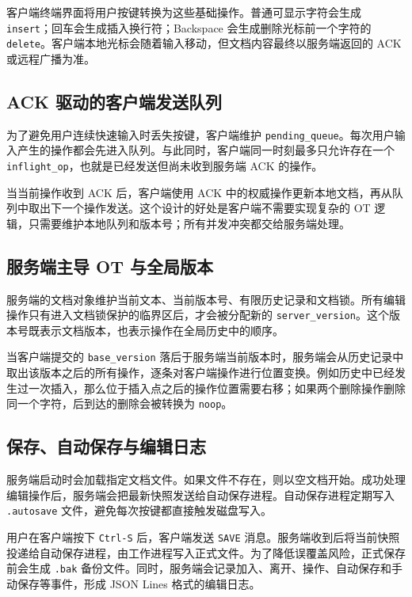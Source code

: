 客户端终端界面将用户按键转换为这些基础操作。普通可显示字符会生成 \verb|insert|；回车会生成插入换行符；Backspace 会生成删除光标前一个字符的 \verb|delete|。客户端本地光标会随着输入移动，但文档内容最终以服务端返回的 ACK 或远程广播为准。

\subsection{ACK 驱动的客户端发送队列}

为了避免用户连续快速输入时丢失按键，客户端维护 \verb|pending_queue|。每次用户输入产生的操作都会先进入队列。与此同时，客户端同一时刻最多只允许存在一个 \verb|inflight_op|，也就是已经发送但尚未收到服务端 ACK 的操作。

当当前操作收到 ACK 后，客户端使用 ACK 中的权威操作更新本地文档，再从队列中取出下一个操作发送。这个设计的好处是客户端不需要实现复杂的 OT 逻辑，只需要维护本地队列和版本号；所有并发冲突都交给服务端处理。

\subsection{服务端主导 OT 与全局版本}

服务端的文档对象维护当前文本、当前版本号、有限历史记录和文档锁。所有编辑操作只有进入文档锁保护的临界区后，才会被分配新的 \verb|server_version|。这个版本号既表示文档版本，也表示操作在全局历史中的顺序。

当客户端提交的 \verb|base_version| 落后于服务端当前版本时，服务端会从历史记录中取出该版本之后的所有操作，逐条对客户端操作进行位置变换。例如历史中已经发生过一次插入，那么位于插入点之后的操作位置需要右移；如果两个删除操作删除同一个字符，后到达的删除会被转换为 \verb|noop|。

\subsection{保存、自动保存与编辑日志}

服务端启动时会加载指定文档文件。如果文件不存在，则以空文档开始。成功处理编辑操作后，服务端会把最新快照发送给自动保存进程。自动保存进程定期写入 \verb|.autosave| 文件，避免每次按键都直接触发磁盘写入。

用户在客户端按下 \verb|Ctrl-S| 后，客户端发送 \verb|SAVE| 消息。服务端收到后将当前快照投递给自动保存进程，由工作进程写入正式文件。为了降低误覆盖风险，正式保存前会生成 \verb|.bak| 备份文件。同时，服务端会记录加入、离开、操作、自动保存和手动保存等事件，形成 JSON Lines 格式的编辑日志。

